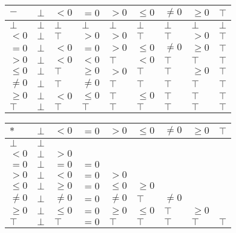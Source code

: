 \documentclass{article}
\begin{document}
    \begin{table}[]
        \begin{tabular}{|l|l|l|l|l|l|l|l|l|}
        \hline
        $-$     & $\bot$ & $<0$   & $=0$    & $>0$   & $\le 0$ & $\ne 0$ & $\ge 0$ & $\top$ \\ \hline
        $\bot$  & $\bot$ & $\bot$ & $\bot$  & $\bot$ & $\bot$  & $\bot$  & $\bot$  & $\bot$ \\ \hline
        $<0$    & $\bot$ & $\top$ & $>0$    & $>0$   & $\top$  & $\top$  & $>0$    & $\top$ \\ \hline
        $=0$    & $\bot$ & $<0$   & $=0$    & $>0$   & $\le 0$ & $\ne 0$ & $\ge 0$ & $\top$ \\ \hline
        $>0$    & $\bot$ & $<0$   & $<0$    & $\top$ & $<0$    & $\top$  & $\top$  & $\top$ \\ \hline
        $\le 0$ & $\bot$ & $\top$ & $\ge 0$ & $>0$   & $\top$  & $\top$  & $\ge 0$ & $\top$ \\ \hline
        $\ne 0$ & $\bot$ & $\top$ & $\ne 0$ & $\top$ & $\top$  & $\top$  & $\top$  & $\top$ \\ \hline
        $\ge 0$ & $\bot$ & $<0$   & $\le 0$ & $\top$ & $\le 0$ & $\top$  & $\top$  & $\top$ \\ \hline
        $\top$  & $\bot$ & $\top$ & $\top$  & $\top$ & $\top$  & $\top$  & $\top$  & $\top$ \\ \hline
        \end{tabular}
        \end{table}


        \begin{table}[]
            \begin{tabular}{|l|l|l|l|l|l|l|l|l|}
            \hline
            $*$     & $\bot$ & $<0$    & $=0$ & $>0$    & $\le 0$ & $\ne 0$ & $\ge 0$ & $\top$ \\ \hline
            $\bot$  & $\bot$ &         &      &         &         &         &         &        \\ \hline
            $<0$    & $\bot$ & $>0$    &      &         &         &         &         &        \\ \hline
            $=0$    & $\bot$ & $=0$    & $=0$ &         &         &         &         &        \\ \hline
            $>0$    & $\bot$ & $<0$    & $=0$ & $>0$    &         &         &         &        \\ \hline
            $\le 0$ & $\bot$ & $\ge 0$ & $=0$ & $\le 0$ & $\ge 0$ &         &         &        \\ \hline
            $\ne 0$ & $\bot$ & $\ne 0$ & $=0$ & $\ne 0$ & $\top$  & $\ne 0$ &         &        \\ \hline
            $\ge 0$ & $\bot$ & $\le 0$ & $=0$ & $\ge 0$ & $\le 0$ & $\top$  & $\ge 0$ &        \\ \hline
            $\top$  & $\bot$ & $\top$  & $=0$ & $\top$  & $\top$  & $\top$  & $\top$  & $\top$ \\ \hline
            \end{tabular}
            \end{table}
\end{document}
